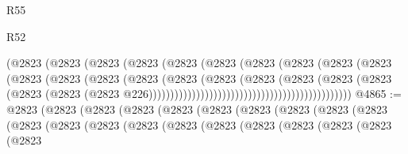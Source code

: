 \begin{lexlean}{R55}
\begin{lexlean}{R52}
\begin{coremodule}
{{{{{{{{{{{{{{{{{{{{{{{{{{{{{{{{{{{{{{{{{{{{{{{{{{{{{{{{{{{{{{{{{{{{{{{{{{{{{{{{{{{{{{{{{{{{{{{{{{{{{{{{{{{{{{{{{{{{{{{{{{{{{{{{{{{{{{{{{{{{{{{{{{{{{{{{{{{{{{{{{{{{{{{{{{{{{{{{{{{{{{{{{{{{{{{{{{{{{{                                                    (@2823
                                                      (@2823
                                                        (@2823
                                                          (@2823
                                                            (@2823
                                                              (@2823
                                                                (@2823
                                                                  (@2823
                                                                    (@2823
                                                                      (@2823
                                                                        (@2823
                                                                          (@2823
                                                                            (@2823
                                                                              (@2823
                                                                                (@2823
                                                                                  (@2823
                                                                                    (@2823
                                                                                      (@2823
                                                                                        (@2823
                                                                                          (@2823
                                                                                            (@2823
                                                                                              (@2823
                                                                                                (@2823
                                                                                                  @226)))))))))))))))))))))))))))))))))))))))))))))))
@4865 := @2823
    (@2823
      (@2823
        (@2823
          (@2823
            (@2823
              (@2823
                (@2823
                  (@2823
                    (@2823
                      (@2823
                        (@2823
                          (@2823
                            (@2823
                              (@2823
                                (@2823
                                  (@2823
                                    (@2823
                                      (@2823
                                        (@2823
                                          (@2823
}}}}}}}}}}}}}}}}}}}}}}}}}}}}}}}}}}}}}}}}}}}}}}}}}}}}}}}}}}}}}}}}}}}}}}}}}}}}}}}}}}}}}}}}}}}}}}}}}}}}}}}}}}}}}}}}}}}}}}}}}}}}}}}}}}}}}}}}}}}}}}}}}}}}}}}}}}}}}}}}}}}}}}}}}}}}}}}}}}}}}}}}}}}}}}}}}}}}}}
\end{coremodule}
\end{lexlean}
\end{lexlean}
